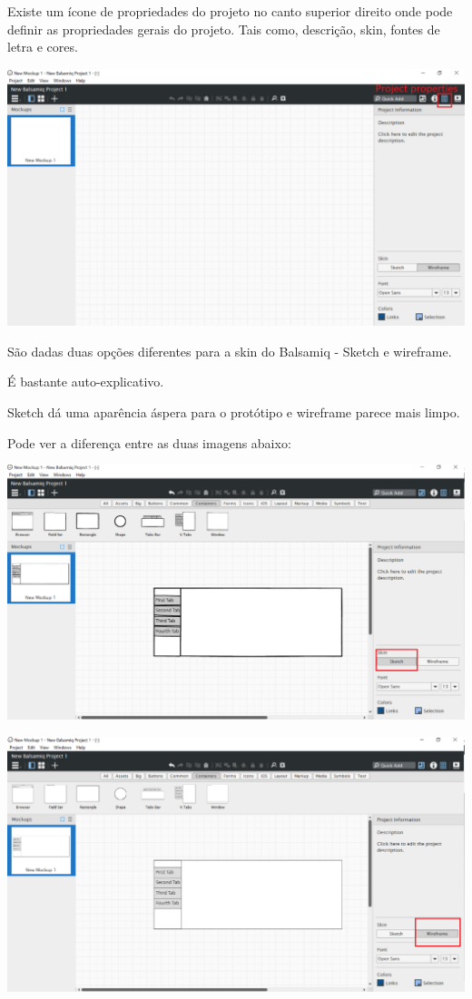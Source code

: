 \documentclass{tufte-book} %
\begin{document}
Existe um ícone de propriedades do projeto no canto superior direito onde pode definir as propriedades gerais do projeto. Tais como, descrição, skin, fontes de letra e cores.

\begin{center}
	\includegraphics{img5.png}
\end{center}

São dadas duas opções diferentes para a skin do Balsamiq - Sketch e wireframe.

É bastante auto-explicativo.

Sketch dá uma aparência áspera para o protótipo e wireframe parece mais limpo.

\break

Pode ver a diferença entre as duas imagens abaixo:

\begin{center}
	\includegraphics{img6.png}
\end{center}

\begin{center}
	\includegraphics{img7.png}
\end{center}


\backmatter





\printindex
\end{document}
